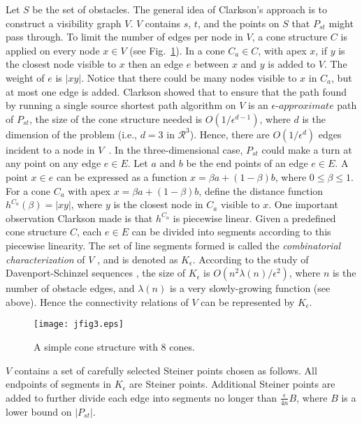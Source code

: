 \documentclass{llncs}
\begin{document}
Let $S$ be the set of obstacles.
The general idea of Clarkson's approach is to construct a visibility graph $V$.
$V$ contains $s$, $t$, and the points on $S$ that $P_{st}$ might pass through. To limit the number of
edges per node in $V$, a cone structure $C$ is applied on every node $x\in V$
(see Fig.~\ref{jfig3}). In a cone $C_a\in C$,
with apex $x$, if $y$ is the closest node visible to $x$ then an edge $e$ between $x$ and $y$ is added to
$V$. The weight of $e$ is $|xy|$. Notice that there could be many nodes visible to $x$ in $C_a$, but at
most one edge is added. Clarkson showed that to ensure that the path found by running a single
source shortest path algorithm on $V$ is an $\epsilon$-$approximate$ path of $P_{st}$,
the size of the cone structure needed is $O(1/{\epsilon}^{d-1})$, where $d$ is the dimension of the problem
(i.e., $d=3$ in $\mathcal{R}^3$).
Hence, there are $O(1/{\epsilon}^d)$ edges incident to a node in $V$~\cite{Clar87}.
In the three-dimensional case, $P_{st}$ could make a turn at any point on any edge $e \in E$.
Let $a$ and $b$ be the end points of an edge $e \in E$. A point $x \in e$ can be expressed as a function
$x=\beta a+(1-\beta)b$, where $0 \le \beta \le 1$.
For a cone $C_a$ with apex $x=\beta a+(1-\beta)b$,
define the distance function $h^{C_a}(\beta)=|xy|$, where
$y$ is the closest node in $C_a$ visible to $x$.
One important observation Clarkson made is that $h^{C_a}$ is piecewise linear.
Given a predefined cone structure $C$, each $e\in E$ can be divided into segments according to
this piecewise
linearity. The set of line segments formed is called the \emph{combinatorial characterization} of
$V$ \cite{Clar87}, and is denoted as $K_{\epsilon}$. According to the study of Davenport-Schinzel
sequences \cite{SCK86}, the size of $K_{\epsilon}$ is $O(n^2\lambda(n)/{\epsilon}^2)$, where $n$ is the
number of obstacle edges, and $\lambda(n)$ is a very slowly-growing function (see above).
Hence the connectivity relations of $V$ can be represented by $K_{\epsilon}$.

\begin{figure}\begin{center}
    \leavevmode
\texttt{[image: jfig3.eps]}
    \caption{A simple cone structure with 8 cones.}
    \label{jfig3}
    \end{center}
\end{figure}

$V$ contains a set of
carefully selected Steiner points chosen as follows.
All endpoints of segments in $K_{\epsilon}$ are Steiner
points. Additional Steiner points are added to further divide each edge into segments no longer than
$\frac{\epsilon}{4n}B$, where $B$ is a lower bound on $|P_{st}|$.
\end{document}
